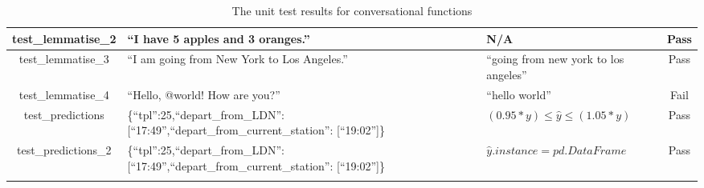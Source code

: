 \begin{landscape}
\begin{longtable}{|c|p{5cm}|p{5cm}|c|}
        \hline
        test\_lemmatise\_2 & ``I have 5 apples and 3 oranges.'' & N/A & Pass \\
        \hline
        test\_lemmatise\_3 & ``I am going from New York to Los Angeles.'' & ``going from new york to los angeles'' & Pass \\
        \hline
        test\_lemmatise\_4 & ``Hello, @world! How are you?'' & ``hello world'' & Fail \\
        \hline
        test\_predictions & \{``tpl'':25,``depart\_from\_LDN'': [``17:49'',``depart\_from\_current\_station'': [``19:02'']\} & $(0.95 * y) \leq \hat{y} \leq (1.05 * y)$ & Pass \\
        \hline
        test\_predictions\_2 & \{``tpl'':25,``depart\_from\_LDN'': [``17:49'',``depart\_from\_current\_station'': [``19:02'']\} & $\hat{y}.instance = pd.DataFrame$ & Pass \\
        \hline
        \caption{The unit test results for conversational functions}
        \label{Tab: unit tests convo functions}
    \end{longtable}
\end{landscape}

